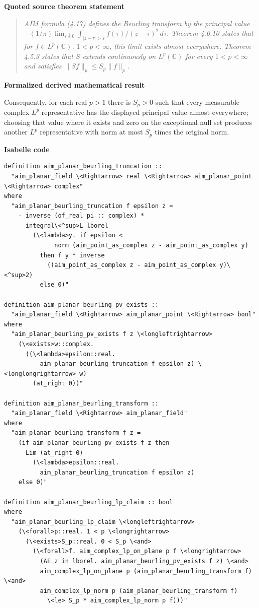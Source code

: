 \documentclass[10pt,oneside]{article}
\newenvironment{sourcequote}{\begin{quote}\itshape}{\end{quote}}
\newcommand{\reviewlabel}[1]{\par\smallskip\noindent\textsf{\bfseries #1}\par\smallskip}
\begin{document}
\reviewlabel{Quoted source theorem statement}
\begin{sourcequote}
AIM formula (4.17) defines the Beurling transform by the principal value $-(1/\pi)\lim_{\varepsilon\downarrow0}\int_{|z-\tau|>\varepsilon} f(\tau)/(z-\tau)^2\,d\tau$. Theorem 4.0.10 states that for $f\in L^p(\mathbb C)$, $1<p<\infty$, this limit exists almost everywhere. Theorem 4.5.3 states that $S$ extends continuously on $L^p(\mathbb C)$ for every $1<p<\infty$ and satisfies $\|Sf\|_p\leq S_p\|f\|_p$.
\end{sourcequote}

\reviewlabel{Formalized derived mathematical result}
Consequently, for each real $p>1$ there is $S_p>0$ such that every measurable complex $L^p$ representative has the displayed principal value almost everywhere; choosing that value where it exists and zero on the exceptional null set produces another $L^p$ representative with norm at most $S_p$ times the original norm.

\reviewlabel{Isabelle code}
\begin{lstlisting}
definition aim_planar_beurling_truncation ::
  "aim_planar_field \<Rightarrow> real \<Rightarrow> aim_planar_point \<Rightarrow> complex"
where
  "aim_planar_beurling_truncation f epsilon z =
    - inverse (of_real pi :: complex) *
      integral\<^sup>L lborel
        (\<lambda>y. if epsilon <
              norm (aim_point_as_complex z - aim_point_as_complex y)
          then f y * inverse
            ((aim_point_as_complex z - aim_point_as_complex y)\<^sup>2)
          else 0)"

definition aim_planar_beurling_pv_exists ::
  "aim_planar_field \<Rightarrow> aim_planar_point \<Rightarrow> bool"
where
  "aim_planar_beurling_pv_exists f z \<longleftrightarrow>
    (\<exists>w::complex.
      ((\<lambda>epsilon::real.
          aim_planar_beurling_truncation f epsilon z) \<longlongrightarrow> w)
        (at_right 0))"

definition aim_planar_beurling_transform ::
  "aim_planar_field \<Rightarrow> aim_planar_field"
where
  "aim_planar_beurling_transform f z =
    (if aim_planar_beurling_pv_exists f z then
      Lim (at_right 0)
        (\<lambda>epsilon::real.
          aim_planar_beurling_truncation f epsilon z)
    else 0)"

definition aim_planar_beurling_lp_claim :: bool
where
  "aim_planar_beurling_lp_claim \<longleftrightarrow>
    (\<forall>p::real. 1 < p \<longrightarrow>
      (\<exists>S_p::real. 0 < S_p \<and>
        (\<forall>f. aim_complex_lp_on_plane p f \<longrightarrow>
          (AE z in lborel. aim_planar_beurling_pv_exists f z) \<and>
          aim_complex_lp_on_plane p (aim_planar_beurling_transform f) \<and>
          aim_complex_lp_norm p (aim_planar_beurling_transform f)
            \<le> S_p * aim_complex_lp_norm p f)))"
\end{lstlisting}
\end{document}
